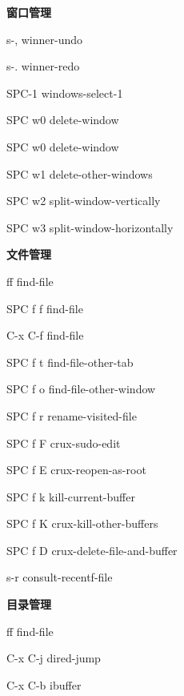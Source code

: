 \documentclass[10pt]{article}
\renewcommand\subsection[1]{\smallskip\par\textbf{\color{heading}#1}}
\begin{document}
\begin{multicols}{4}
  \subsection{窗口管理}
  \begin{keylist}
  \item[s-,] winner-undo
  \item[s-.] winner-redo
  \item[SPC-1] windows-select-1
  \item[SPC w0] delete-window
  \item[SPC w0] delete-window
  \item[SPC w1] delete-other-windows
  \item[SPC w2] split-window-vertically
  \item[SPC w3] split-window-horizontally
  \end{keylist}

  \subsection{文件管理}
  \begin{keylist}
  \item[ff] find-file
  \item[SPC f f] find-file
  \item[C-x C-f] find-file
  \item[SPC f t] find-file-other-tab
  \item[SPC f o] find-file-other-window
  \item[SPC f r] rename-visited-file
  \item[SPC f F] crux-sudo-edit
  \item[SPC f E] crux-reopen-as-root
  \item[SPC f k] kill-current-buffer
  \item[SPC f K] crux-kill-other-buffers
  \item[SPC f D] crux-delete-file-and-buffer
  \item[s-r] consult-recentf-file

  \subsection{目录管理}
  \begin{keylist}
  \item[ff] find-file
  \item[C-x C-j] dired-jump
  \item[C-x C-b] ibuffer
  \end{keylist}


\end{keylist}
\end{multicols}
\end{document}
